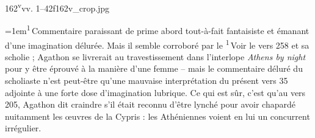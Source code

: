\documentclass{thesmo}
\begin{document}
\begin{folio}{162\textsuperscript{v}}{vv. 1–42}{f162v_crop.jpg}
\begin{texte}
{\par{\fontsize{7.6}{9.4}\selectfont\leftskip=1em\noindent \textsuperscript{1}\,Commentaire paraissant de prime abord tout-à-fait fantaisiste et émanant d'une imagination délurée. Mais il semble corroboré par le  \textsuperscript{1}\,Voir le vers 258 et sa scholie ; Agathon se livrerait au travestissement dans l'interlope \textit{Athens by night} pour y être éprouvé à la manière d'une femme -- mais le commentaire déluré du scholiaste n'est peut-être qu'une mauvaise interprétation du présent vers 35 adjointe à une forte dose d'imagination lubrique. Ce qui est sûr, c'est qu'au vers 205, Agathon dit craindre s'il était reconnu d'être lynché pour avoir chapardé nuitamment les œuvres de la Cypris : les Athéniennes voient en lui un concurrent irrégulier.\par}}
\end{texte}
\end{folio}
\end{document}
